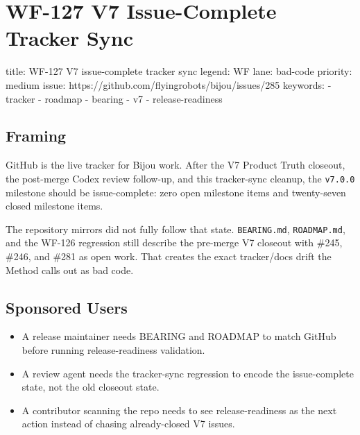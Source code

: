 \chapter{WF-127 V7 Issue-Complete Tracker Sync}\label{record-209}

\smallskip

\begin{RecordMeta}
title: WF-127 V7 issue-complete tracker sync
legend: WF
lane: bad-code
priority: medium
issue: https://github.com/flyingrobots/bijou/issues/285
keywords:
  - tracker
  - roadmap
  - bearing
  - v7
  - release-readiness

\end{RecordMeta}

\section{Framing}\label{record-209-framing}

GitHub is the live tracker for Bijou work. After the V7 Product Truth closeout, the post-merge Codex review follow-up, and this tracker-sync cleanup, the \texttt{v\allowbreak{}7\allowbreak{}.\allowbreak{}0\allowbreak{}.\allowbreak{}0} milestone should be issue-complete: zero open milestone items and twenty-seven closed milestone items.

The repository mirrors did not fully follow that state. \texttt{B\allowbreak{}E\allowbreak{}A\allowbreak{}R\allowbreak{}I\allowbreak{}N\allowbreak{}G\allowbreak{}.\allowbreak{}m\allowbreak{}d}, \texttt{R\allowbreak{}O\allowbreak{}A\allowbreak{}D\allowbreak{}M\allowbreak{}A\allowbreak{}P\allowbreak{}.\allowbreak{}m\allowbreak{}d}, and the WF-126 regression still describe the pre-merge V7 closeout with \#245, \#246, and \#281 as open work. That creates the exact tracker/docs drift the Method calls out as bad code.

\section{Sponsored Users}\label{record-209-sponsored-users}

\begin{itemize}
\tightlist
\item
  A release maintainer needs BEARING and ROADMAP to match GitHub before running release-readiness validation.
\item
  A review agent needs the tracker-sync regression to encode the issue-complete state, not the old closeout state.
\item
  A contributor scanning the repo needs to see release-readiness as the next action instead of chasing already-closed V7 issues.
\end{itemize}

